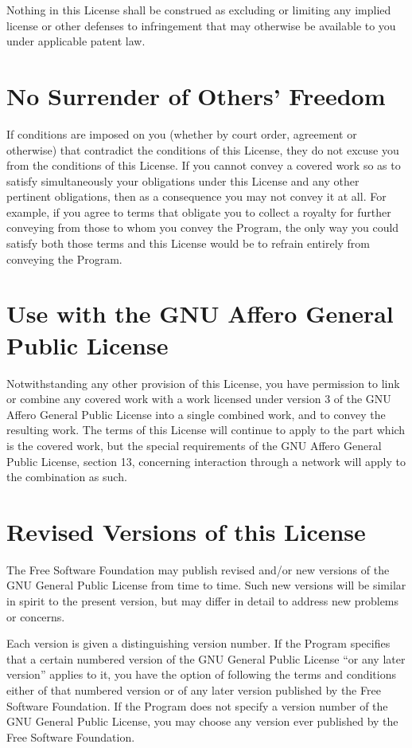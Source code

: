 Nothing in this License shall be construed as excluding or limiting any implied license or other defenses to infringement that may otherwise be available to you under applicable patent law.
\section{No Surrender of Others' Freedom}

If conditions are imposed on you (whether by court order, agreement or otherwise) that contradict the conditions of this License, they do not excuse you from the conditions of this License. If you cannot convey a covered work so as to satisfy simultaneously your obligations under this License and any other pertinent obligations, then as a consequence you may not convey it at all. For example, if you agree to terms that obligate you to collect a royalty for further conveying from those to whom you convey the Program, the only way you could satisfy both those terms and this License would be to refrain entirely from conveying the Program.
\section{Use with the GNU Affero General Public License}

Notwithstanding any other provision of this License, you have permission to link or combine any covered work with a work licensed under version 3 of the GNU Affero General Public License into a single combined work, and to convey the resulting work. The terms of this License will continue to apply to the part which is the covered work, but the special requirements of the GNU Affero General Public License, section 13, concerning interaction through a network will apply to the combination as such.
\section{Revised Versions of this License}

The Free Software Foundation may publish revised and/or new versions of the GNU General Public License from time to time. Such new versions will be similar in spirit to the present version, but may differ in detail to address new problems or concerns.

Each version is given a distinguishing version number. If the Program specifies that a certain numbered version of the GNU General Public License “or any later version” applies to it, you have the option of following the terms and conditions either of that numbered version or of any later version published by the Free Software Foundation. If the Program does not specify a version number of the GNU General Public License, you may choose any version ever published by the Free Software Foundation.

